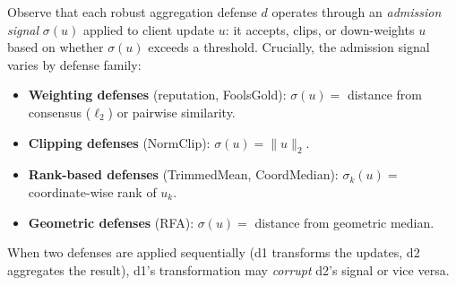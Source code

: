 \documentclass{article}
\begin{document}
Observe that each robust aggregation defense $d$ operates through an \emph{admission signal} $\sigma(u)$ applied to client update $u$: it accepts, clips, or down-weights $u$ based on whether $\sigma(u)$ exceeds a threshold. Crucially, the admission signal varies by defense family:
\begin{itemize}[noitemsep,topsep=2pt]
\item \textbf{Weighting defenses} (reputation, FoolsGold): $\sigma(u) = $ distance from consensus ($\ell_2$) or pairwise similarity.
\item \textbf{Clipping defenses} (NormClip): $\sigma(u) = \|u\|_2$.
\item \textbf{Rank-based defenses} (TrimmedMean, CoordMedian): $\sigma_k(u) = $ coordinate-wise rank of $u_k$.
\item \textbf{Geometric defenses} (RFA): $\sigma(u) = $ distance from geometric median.
\end{itemize}
When two defenses are applied sequentially (d1 transforms the updates, d2 aggregates the result), d1's transformation may \emph{corrupt} d2's signal or vice versa.
\end{document}
